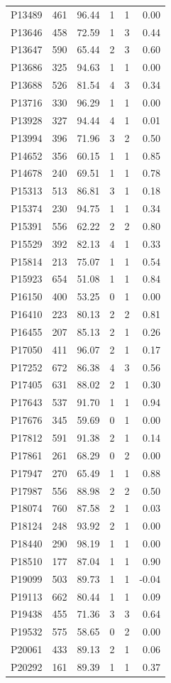 \begin{longtable}{lrrrrr}
P13489 & 461 & 96.44 & 1 & 1 & 0.00 \\
P13646 & 458 & 72.59 & 1 & 3 & 0.44 \\
P13647 & 590 & 65.44 & 2 & 3 & 0.60 \\
P13686 & 325 & 94.63 & 1 & 1 & 0.00 \\
P13688 & 526 & 81.54 & 4 & 3 & 0.34 \\
P13716 & 330 & 96.29 & 1 & 1 & 0.00 \\
P13928 & 327 & 94.44 & 4 & 1 & 0.01 \\
P13994 & 396 & 71.96 & 3 & 2 & 0.50 \\
P14652 & 356 & 60.15 & 1 & 1 & 0.85 \\
P14678 & 240 & 69.51 & 1 & 1 & 0.78 \\
P15313 & 513 & 86.81 & 3 & 1 & 0.18 \\
P15374 & 230 & 94.75 & 1 & 1 & 0.34 \\
P15391 & 556 & 62.22 & 2 & 2 & 0.80 \\
P15529 & 392 & 82.13 & 4 & 1 & 0.33 \\
P15814 & 213 & 75.07 & 1 & 1 & 0.54 \\
P15923 & 654 & 51.08 & 1 & 1 & 0.84 \\
P16150 & 400 & 53.25 & 0 & 1 & 0.00 \\
P16410 & 223 & 80.13 & 2 & 2 & 0.81 \\
P16455 & 207 & 85.13 & 2 & 1 & 0.26 \\
P17050 & 411 & 96.07 & 2 & 1 & 0.17 \\
P17252 & 672 & 86.38 & 4 & 3 & 0.56 \\
P17405 & 631 & 88.02 & 2 & 1 & 0.30 \\
P17643 & 537 & 91.70 & 1 & 1 & 0.94 \\
P17676 & 345 & 59.69 & 0 & 1 & 0.00 \\
P17812 & 591 & 91.38 & 2 & 1 & 0.14 \\
P17861 & 261 & 68.29 & 0 & 2 & 0.00 \\
P17947 & 270 & 65.49 & 1 & 1 & 0.88 \\
P17987 & 556 & 88.98 & 2 & 2 & 0.50 \\
P18074 & 760 & 87.58 & 2 & 1 & 0.03 \\
P18124 & 248 & 93.92 & 2 & 1 & 0.00 \\
P18440 & 290 & 98.19 & 1 & 1 & 0.00 \\
P18510 & 177 & 87.04 & 1 & 1 & 0.90 \\
P19099 & 503 & 89.73 & 1 & 1 & -0.04 \\
P19113 & 662 & 80.44 & 1 & 1 & 0.09 \\
P19438 & 455 & 71.36 & 3 & 3 & 0.64 \\
P19532 & 575 & 58.65 & 0 & 2 & 0.00 \\
P20061 & 433 & 89.13 & 2 & 1 & 0.06 \\
P20292 & 161 & 89.39 & 1 & 1 & 0.37 \\
\end{longtable}
